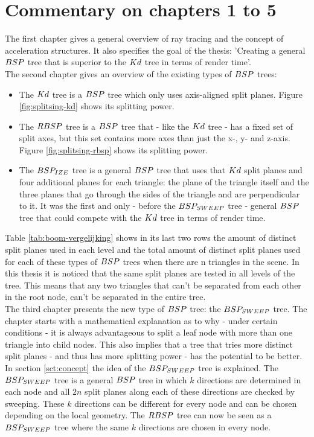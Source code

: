 \newpage

\section{Commentary on chapters 1 to 5}
The first chapter gives a general overview of ray tracing and the concept of acceleration structures.
It also specifies the goal of the thesis: 'Creating a general $BSP$ tree that is superior to the $Kd$ tree in terms of render time'.\\

The second chapter gives an overview of the existing types of $BSP$ trees:
\begin{itemize}
  \item The $Kd$ tree is a $BSP$ tree which only uses axis-aligned split planes. Figure \ref{fig:splitsing-kd} shows its splitting power.
  \item The $RBSP$ tree is a $BSP$ tree that - like the $Kd$ tree - has a fixed set of split axes, but this set contains more axes than just the x-, y- and z-axis. Figure \ref{fig:splitsing-rbsp} shows its splitting power.
  \item The $BSP_{IZE}$ tree is a general $BSP$ tree that uses that $Kd$ split planes and four additional planes for each triangle: the plane of the triangle itself and the three planes that go through the sides of the triangle and are perpendicular to it. 
  It was the first and only - before the $BSP_{SWEEP}$ tree - general $BSP$ tree that could compete with the $Kd$ tree in terms of render time.
\end{itemize}

Table \ref{tab:boom-vergelijking} shows in its last two rows the amount of distinct split planes used in each level and the total amount of distinct split planes used for each of these types of $BSP$ trees when there are n triangles in the scene.
In this thesis it is noticed that the same split planes are tested in all levels of the tree.
This means that any two triangles that can't be separated from each other in the root node, can't be separated in the entire tree.\\

The third chapter presents the new type of $BSP$ tree: the $BSP_{SWEEP}$ tree.
The chapter starts with a mathematical explanation as to why - under certain conditions - it is always advantageous to split a leaf node with more than one triangle into child nodes.
This also implies that a tree that tries more distinct split planes - and thus has more splitting power - has the potential to be better.
In section \ref{sct:concept} the idea of the $BSP_{SWEEP}$ tree is explained.
The $BSP_{SWEEP}$ tree is a general $BSP$ tree in which $k$ directions are determined in each node and all $2n$ split planes along each of these directions are checked by sweeping. 
These $k$ directions can be different for every node and can be chosen depending on the local geometry.
The $RBSP$ tree can now be seen as a $BSP_{SWEEP}$ tree where the same $k$ directions are chosen in every node.\\

